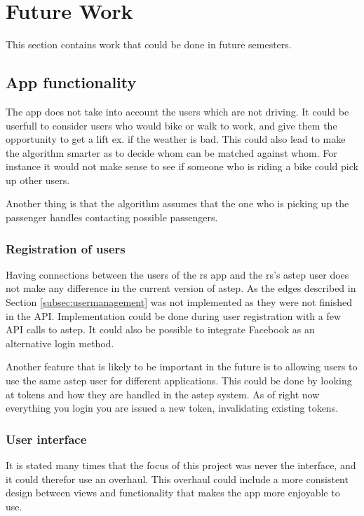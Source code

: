 \section{Future Work}\label{sec:future}
This section contains work that could be done in future semesters.

\subsection{App functionality}
The app does not take into account the users which are not driving.
It could be userfull to consider users who would bike or walk to work, and give them the opportunity to get a lift ex. if the weather is bad.
This could also lead to make the algorithm smarter as to decide whom can be matched against whom.
For instance it would not make sense to see if someone who is riding a bike could pick up other users.

Another thing is that the algorithm assumes that the one who is picking up the passenger handles contacting possible passengers.

\subsubsection*{Registration of users}
Having connections between the users of the \gls{rs} app and the \gls{rs}'s \gls{astep} user does not make any difference in the current version of \gls{astep}.
As the edges described in Section \ref{subsec:usermanagement} was not implemented as they were not finished in the API.
Implementation could be done during user registration with a few API calls to \gls{astep}.
It could also be possible to integrate Facebook as an alternative login method.

Another feature that is likely to be important in the future is to allowing users to use the same \gls{astep} user for different applications.
This could be done by looking at tokens and how they are handled in the \gls{astep} system.
As of right now everything you login you are issued a new token, invalidating existing tokens.

\subsubsection*{User interface}
It is stated many times that the focus of this project was never the interface, and it could therefor use an overhaul.
This overhaul could include a more consistent design between views and functionality that makes the app more enjoyable to use.

